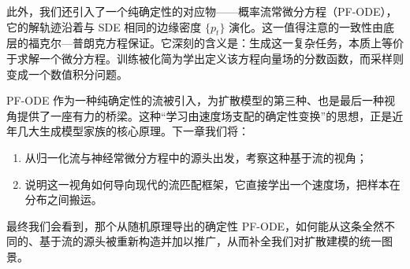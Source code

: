此外，我们还引入了一个纯确定性的对应物——概率流常微分方程（PF-ODE），它的解轨迹沿着与 SDE 相同的边缘密度 $\{p_t\}$ 演化。这一值得注意的一致性由底层的福克尔—普朗克方程保证。它深刻的含义是：生成这一复杂任务，本质上等价于求解一个微分方程。训练被化简为学出定义该方程向量场的分数函数，而采样则变成一个数值积分问题。

PF-ODE 作为一种纯确定性的流被引入，为扩散模型的第三种、也是最后一种视角提供了一座有力的桥梁。这种“学习由速度场支配的确定性变换”的思想，正是近年几大生成模型家族的核心原理。下一章我们将：
\begin{enumerate}
    \item 从归一化流与神经常微分方程中的源头出发，考察这种基于流的视角；
    \item 说明这一视角如何导向现代的流匹配框架，它直接学出一个速度场，把样本在分布之间搬运。
\end{enumerate}

最终我们会看到，那个从随机原理导出的确定性 PF-ODE，如何能从这条全然不同的、基于流的源头被重新构造并加以推广，从而补全我们对扩散建模的统一图景。
